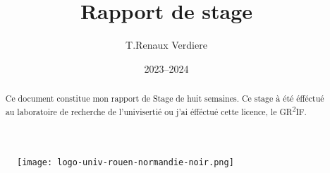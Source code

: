 \documentclass[12pt]{article}
\title{Rapport de stage}
\author{T.Renaux Verdiere}
\date{2023--2024}
\begin{document}
\begin{figure}
    \texttt{[image: logo-univ-rouen-normandie-noir.png]}
\end{figure}

\maketitle

\begin{abstract}
    Ce document constitue mon rapport de Stage de huit semaines. Ce stage à été
    éfféctué au laboratoire de recherche de l'univisertié ou j'ai éfféctué cette  
    licence, le GR\textsuperscript{2}IF.  
\end{abstract}

\newpage   

\tableofcontents

\newpage









\newpage

\printbibliography
\end{document}
